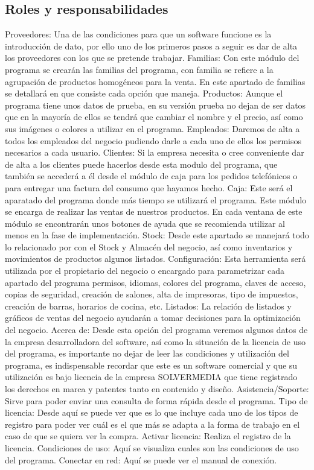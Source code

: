 \documentclass[12pt,a4paper]{article}
\begin{document}
\subsection{Roles y responsabilidades}
Proveedores: Una de las condiciones para que un software funcione es la introducción de dato, por ello uno de los primeros pasos a seguir es dar de alta los proveedores con los que se pretende trabajar.
Familias: Con este módulo del programa se crearán las familias del programa, con familia se refiere a la agrupación de productos homogéneos para la venta. En este apartado de familias se detallará en que consiste cada opción que maneja.
Productos: Aunque el programa tiene unos datos de prueba, en su versión prueba no dejan de ser datos que en la mayoría de ellos se tendrá que cambiar el nombre y el precio, así como sus imágenes o colores a utilizar en el programa.
Empleados: Daremos de alta a todos los empleados del negocio pudiendo darle a cada uno de ellos los permisos necesarios a cada usuario.
Clientes: Si la empresa necesita o cree conveniente dar de alta a los clientes puede hacerlos desde esta modulo del programa, que también se accederá a él desde el módulo de caja para los pedidos telefónicos o para entregar una factura del consumo que hayamos hecho.
Caja: Este será el aparatado del programa donde más tiempo se utilizará el programa. Este módulo se encarga de realizar las ventas de nuestros productos. En cada ventana de este módulo se encontrarán unos botones de ayuda que se recomienda utilizar al menos en la fase de implementación.
Stock: Desde este apartado se manejará todo lo relacionado por con el Stock y Almacén del negocio, así como inventarios y movimientos de productos algunos listados.
Configuración: Esta herramienta será utilizada por el propietario del negocio o encargado para parametrizar cada apartado del programa permisos, idiomas, colores del programa, claves de acceso, copias de seguridad, creación de salones, alta de impresoras, tipo de impuestos, creación de barras, horarios de cocina, etc.
Listados: La relación de listados y gráficos de ventas del negocio ayudarán a tomar decisiones para la optimización del negocio.
Acerca de: Desde esta opción del programa veremos algunos datos de la empresa desarrolladora del software, así como la situación de la licencia de uso del programa, es importante no dejar de leer las condiciones y utilización del programa, es indispensable recordar que este es un software comercial y que su utilización es bajo licencia de la empresa SOLVERMEDIA que tiene registrado los derechos en marca y patentes tanto en contenido y diseño.
Asistencia/Soporte: Sirve para poder enviar una consulta de forma rápida desde el programa.
Tipo de licencia: Desde aquí se puede ver que es lo que incluye cada uno de los tipos de registro para poder ver cuál es el que más se adapta a la forma de trabajo en el caso de que se quiera ver la compra.
Activar licencia: Realiza el registro de la licencia.
Condiciones de uso: Aquí se visualiza cuales son las condiciones de uso del programa.
Conectar en red: Aquí se puede ver el manual de conexión.
\par\vspace{3cm}
\end{document}
